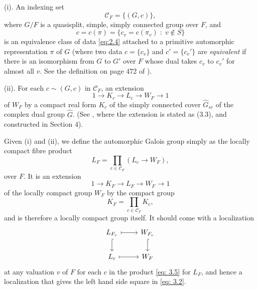 \documentclass[preprint,12pt, leqno]{elsarticle}
\newcommand{\cC}{\mathcal{C}}
\newcommand{\ubf}[1]{\textit{#1}}
\newcommand{\whG}{\widehat{G}}
\numberwithin{equation}{section}
\theoremstyle{named}
\begin{document}
(i). An indexing set
\begin{equation*}
    \cC_F = \{(G, c)\},
\end{equation*}
where $G/F$ is a quasisplit, simple, simply connected group over $F$, and
\begin{equation*}
    c = c(\pi) = \{c_v = c(\pi_v) \;:\; v\notin S\}
\end{equation*}
is an equivalence class of data \eqref{eq:2.4} attached to a primitive automorphic representation $\pi$ of $G$ (where two data $c = \{c_v\}$ and $c' = \{c_v'\}$ are \ubf{equivalent} if there is an isomorphism from $G$ to $G'$ over $F$ whose dual takes $c_v$ to $c_v'$ for almost all $v$. See the definition on page 472 of \cite{Ar2}).

(ii). For each $c\sim (G, c)$ in $\cC_F$, an extension
\begin{equation}\label{eq: 3.4}
    1 \longrightarrow K_c \longrightarrow L_c \longrightarrow W_F \longrightarrow 1
\end{equation}
of $W_F$ by a compact real form $K_c$ of the simply connected cover $\whG_{sc}$ of the complex dual group $\whG$. (See \cite{Ar2}, where the extension is stated as (3.3), and constructed in Section 4).

Given (i) and (ii), we define the automorphic Galois group simply as the locally compact fibre product
\begin{equation}\label{eq: 3.5}
    L_F = \prod_{c\in\mathcal{C}_F}(L_c\longrightarrow W_F),
\end{equation}
over $F$. It is an extension
\begin{equation}\label{eq: 3.6}
    1 \longrightarrow K_F \longrightarrow L_F \longrightarrow W_F \longrightarrow 1
\end{equation}
of the locally compact group $W_F$ by the compact group
\begin{equation*}
    K_F = \prod_{c\in\mathcal{C}_F}K_c,
\end{equation*}
and is therefore a locally compact group itself. It should come with a localization
\begin{equation*}
      \begin{tikzcd}
       L_{F_v} \ar[r, mapsto]\ar[d, hook] & W_{F_v} \ar[d, hook]\\
       L_c \ar[r, mapsto] & W_F
   \end{tikzcd}
\end{equation*}
at any valuation $v$ of $F$ for each $c$ in the product \eqref{eq: 3.5} for $L_F$, and hence a localization that gives the left hand side square in \eqref{eq: 3.2}.
\end{document}
